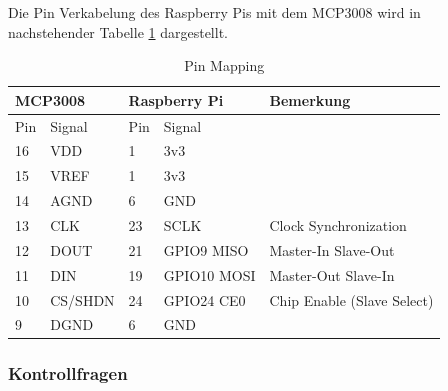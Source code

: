 \documentclass{article}
\begin{document}
\newpage

Die Pin Verkabelung des Raspberry Pis mit dem MCP3008 wird in nachstehender Tabelle \ref{tab:Verkabelung} dargestellt. 
\begin{table}[h!]
    \begin{tabular}{|l|l|l|l|l|}
    \hline
    \multicolumn{2}{|l|}{\textbf{MCP3008}} & \multicolumn{2}{l|}{\textbf{Raspberry Pi}} & \textbf{Bemerkung}         \\ \hline
    Pin         & Signal          & Pin         & Signal              &                            \\ \hline
    16          & VDD             & 1           & 3v3                 &                            \\ \hline
    15          & VREF            & 1           & 3v3                 &                            \\ \hline
    14          & AGND            & 6           & GND                 &                            \\ \hline
    13          & CLK             & 23          & SCLK                & Clock Synchronization      \\ \hline
    12          & DOUT            & 21          & GPIO9 MISO          & Master-In Slave-Out        \\ \hline
    11          & DIN             & 19          & GPIO10 MOSI         & Master-Out Slave-In        \\ \hline
    10          & CS/SHDN         & 24          & GPIO24 CE0          & Chip Enable (Slave Select) \\ \hline
    9           & DGND            & 6           & GND                 &                            \\ \hline
    \end{tabular}
    \caption{Pin Mapping}
    \label{tab:Verkabelung}
\end{table}

\newpage
\subsubsection{Kontrollfragen}
\end{document}
